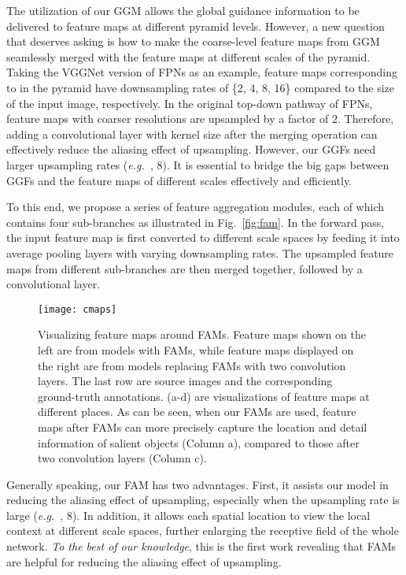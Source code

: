 \documentclass[10pt,twocolumn,letterpaper]{article}
\def\eg{\emph{e.g.~}}
\newcommand{\figref}[1]{Fig.~\ref{#1}}
\begin{document}
The utilization of our GGM allows the global guidance information 
to be delivered to feature maps at different pyramid levels.
However, a new question that deserves asking is how to make the 
coarse-level feature maps from GGM seamlessly merged with the 
feature maps at different scales of the pyramid.
Taking the VGGNet version of FPNs as an example, feature maps
corresponding to  in the pyramid have
downsampling rates of \{2, 4, 8, 16\} compared to the size of 
the input image, respectively.
In the original top-down pathway of FPNs, feature maps with 
coarser resolutions are upsampled by a factor of 2.
Therefore, adding a convolutional layer with kernel size  
after the merging operation can effectively reduce the aliasing 
effect of upsampling.
However, our GGFs need larger upsampling rates (\eg, 8).
It is essential to bridge the big gaps between GGFs and the
feature maps of different scales effectively and efficiently.


To this end, we propose a series of feature aggregation modules, 
each of which contains four sub-branches as illustrated in \figref{fig:fam}.
In the forward pass, the input feature map is first converted to 
different scale spaces by feeding it into average pooling layers 
with varying downsampling rates.
The upsampled feature maps from different sub-branches are then merged together,
followed by a  convolutional layer.

\begin{figure}[tp]
  \centering
  \texttt{[image: cmaps]} \\
\vspace{3pt}
	\caption{Visualizing feature maps around FAMs. Feature maps shown on the left are
	from models with FAMs, while feature maps displayed on the right
	are from models replacing FAMs with two convolution layers.
	The last row are source images and the corresponding ground-truth annotations.
	(a-d) are visualizations of feature maps at different places. As can be seen,
	when our FAMs are used, feature maps after FAMs can more precisely
	capture the location and detail information of salient objects (Column a),
	compared to those after two convolution layers (Column c).
	}
	\label{fig:chm_effects}
\end{figure}

Generally speaking, our FAM has two advantages.
First, it assists our model in reducing the aliasing effect of
upsampling, especially when the upsampling rate is large (\eg, 8).
In addition, it allows each spatial location to view the local context 
at different scale spaces, further enlarging the receptive field of 
the whole network.
\emph{To the best of our knowledge}, this is the first work revealing that FAMs
are helpful for reducing the aliasing effect of upsampling.
\end{document}
